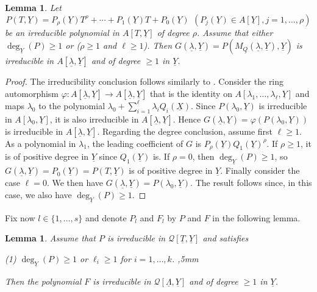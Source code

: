\documentclass[11pt,a4paper,reqno]{amsart}
\newtheorem{lem}[thm]{Lemma}
\theoremstyle{definition}
\begin{document}
\begin{lem}\label{lem:spec}
Let
$$P(T,\underline{Y})=P_{\rho}(\underline{Y}) T^{\rho} +\cdots+ P_{1}(\underline{Y}) T + P_{0}(\underline{Y})\,\ (P_j(\underline{Y}) \in A[\underline{Y}], j=1,\dots,\rho)
$$ be an irreducible polynomial in $A[T,\underline{Y}]$ of degree $\rho$. Assume that either $\deg_{\underline{Y}}(P) \geq 1$ or ($\rho \geq 1$ and $\ell \geq 1$). Then $G(\underline{\lambda},\underline{Y})=P(M_{\underline{Q}}(\underline{\lambda},\underline{Y}),\underline{Y})$ is irreducible in $A[\underline{\lambda},\underline{Y}]$ and of degree $\geq 1$ in $\underline{Y}$.
\end{lem}
\begin{proof}
The irreducibility conclusion follows similarly to \cite[Lemma 2.1]{BDN20b}. Consider the ring automorphism $\varphi:A[\underline{\lambda},\underline{Y}] \rightarrow A[\underline{\lambda},\underline{Y}]$ that is the identity on $A[\lambda_1,\ldots,\lambda_\ell,\underline{Y}]$ and maps $\lambda_0$ to 
the polynomial $\lambda_0 +  \sum_{i=1}^{\ell} \lambda_i Q_i (\underline{X})$. Since $P(\lambda_{0},\underline{Y})$ is irreducible in $A[\lambda_{0},\underline{Y}]$, it is also irreducible in 
$A[\underline{\lambda},\underline{Y}]$. Hence $G(\underline{\lambda},\underline{Y})=\varphi(P(\lambda_0,\underline{Y}))$ is irreducible in $A[\underline \lambda, \underline{Y}]$. 
Regarding the degree conclusion, assume first $\ell\geq 1$. As a polynomial in $\lambda_1$, the leading coefficient of $G$ is $P_{\rho}(\underline{Y}) Q_1(\underline{Y})^{\rho}$. If $\rho\geq 1$, it is of positive degree in $\underline{Y}$ since $Q_1(\underline Y)$ is. If $\rho=0$, then $\deg_{\underline{Y}}(P) \geq 1$, so $G(\underline{\lambda},\underline{Y})= P_{0}(\underline Y)=P(T,\underline{Y})$ is of positive degree in $\underline Y$. 
Finally consider the case $\ell =0$. We then have $G(\underline{\lambda},\underline{Y}) = P(\lambda_0,\underline{Y})$. The result follows since, in this case, we also have $\deg_{\underline Y}(P) \geq 1$.
\end{proof}

Fix now $l\in \{1,\ldots,s\}$ and denote $P_l$ and $F_l$ by $P$ and $F$ in the following lemma.

\begin{lem} 
\label{lemmaHS1} Assume that $P$ is irreducible in $\mathcal{Q}[\underline{T},\underline Y]$ and satisfies
\vskip 1mm

\noindent
{\rm (1)} $\deg_{\underline Y}(P) \geq 1$ or $\ell_i \geq 1$ for $i=1,\ldots,k$. 
,5mm

\noindent
Then the polynomial $F$ is irreducible in ${\mathcal Q}[\underline{\Lambda},\underline Y]$ and of degree $\geq 1$ in $\underline Y$.
\end{lem}
\end{document}
